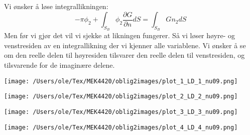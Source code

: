 \documentclass{beamer}
\begin{document}
\begin{frame}
Vi ønsker å løse integrallikningen:
\begin{equation}\label{eq:144}
    -\pi \phi_2  + \int_{S_B} \phi_2 \frac{\partial G}{\partial n}  dS = \int_{S_B} G n_2 dS
\end{equation}
Men før vi gjør det vil vi sjekke at likningen fungerer. Så vi løser høyre- og venstresiden av en integrallikning der vi kjenner alle variablene. Vi ønsker å se om den reelle delen til høyresiden tilsvarer den reelle delen til venstresiden, og tilsvarende for de imaginære delene. 
\end{frame}


\begin{frame}
\begin{minipage}[t]{0.45\linewidth}
    \texttt{[image: /Users/ole/Tex/MEK4420/oblig2images/plot\_1\_LD\_1\_nu09.png]}
\end{minipage}
\hspace{0.05\linewidth}
\begin{minipage}[t]{0.45\linewidth}
    \texttt{[image: /Users/ole/Tex/MEK4420/oblig2images/plot\_2\_LD\_2\_nu09.png]}
\end{minipage}
\begin{minipage}[t]{0.45\linewidth}
    \texttt{[image: /Users/ole/Tex/MEK4420/oblig2images/plot\_3\_LD\_3\_nu09.png]}
\end{minipage}
\hspace{0.05\linewidth}
\begin{minipage}[t]{0.45\linewidth}
    \texttt{[image: /Users/ole/Tex/MEK4420/oblig2images/plot\_4\_LD\_4\_nu09.png]}
\end{minipage}
\end{frame}
\end{document}
